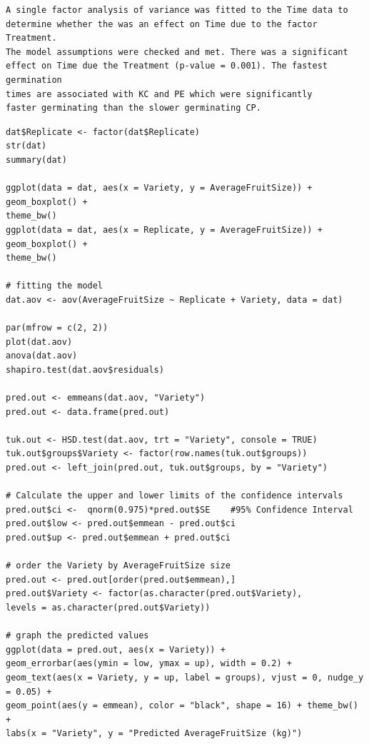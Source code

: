 \documentclass[a4paper, 10pt, fleqn, twosided]{memoir}
\begin{document}
\begin{tcolorbox}[title = Exercise 2 interpretation]
\begin{verbatim}
A single factor analysis of variance was fitted to the Time data to
determine whether the was an effect on Time due to the factor Treatment.
The model assumptions were checked and met. There was a significant
effect on Time due the Treatment (p-value = 0.001). The fastest germination
times are associated with KC and PE which were significantly
faster germinating than the slower germinating CP.
\end{verbatim}
\end{tcolorbox}

\clearpage


\begin{tcolorbox}[title = Exercise 3 code]
\begin{verbatim}
dat$Replicate <- factor(dat$Replicate)
str(dat)
summary(dat)

ggplot(data = dat, aes(x = Variety, y = AverageFruitSize)) + geom_boxplot() +
theme_bw()
ggplot(data = dat, aes(x = Replicate, y = AverageFruitSize)) + geom_boxplot() +
theme_bw()

# fitting the model
dat.aov <- aov(AverageFruitSize ~ Replicate + Variety, data = dat)

par(mfrow = c(2, 2))
plot(dat.aov)
anova(dat.aov)
shapiro.test(dat.aov$residuals)

pred.out <- emmeans(dat.aov, "Variety")
pred.out <- data.frame(pred.out)

tuk.out <- HSD.test(dat.aov, trt = "Variety", console = TRUE)
tuk.out$groups$Variety <- factor(row.names(tuk.out$groups))
pred.out <- left_join(pred.out, tuk.out$groups, by = "Variety")

# Calculate the upper and lower limits of the confidence intervals
pred.out$ci <-  qnorm(0.975)*pred.out$SE    #95% Confidence Interval
pred.out$low <- pred.out$emmean - pred.out$ci
pred.out$up <- pred.out$emmean + pred.out$ci

# order the Variety by AverageFruitSize size
pred.out <- pred.out[order(pred.out$emmean),]
pred.out$Variety <- factor(as.character(pred.out$Variety),
levels = as.character(pred.out$Variety))
 
# graph the predicted values 
ggplot(data = pred.out, aes(x = Variety)) +
geom_errorbar(aes(ymin = low, ymax = up), width = 0.2) +
geom_text(aes(x = Variety, y = up, label = groups), vjust = 0, nudge_y = 0.05) +
geom_point(aes(y = emmean), color = "black", shape = 16) + theme_bw() +
labs(x = "Variety", y = "Predicted AverageFruitSize (kg)")
\end{verbatim}
\end{tcolorbox}
\end{document}
